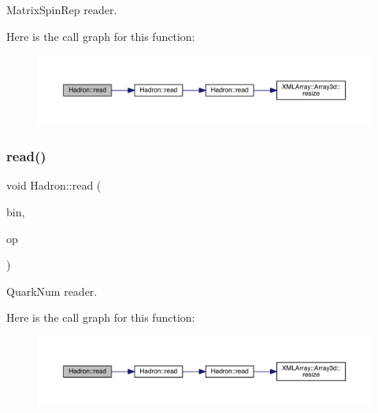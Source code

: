 Matrix\+Spin\+Rep reader. 

Here is the call graph for this function\+:
\nopagebreak
\begin{figure}[H]
\begin{center}
\leavevmode
\includegraphics[width=350pt]{d1/daf/namespaceHadron_ad46ef728c9d609cbf63217c66bdf0285_cgraph}
\end{center}
\end{figure}
\mbox{\label{namespaceHadron_a1f04a3926b07155fbf7e7887169d7f4e}} 
\subsubsection{\texorpdfstring{read()}{read()}\hspace{0.1cm}{\footnotesize\ttfamily [19/94]}}
{\footnotesize\ttfamily void Hadron\+::read (\begin{DoxyParamCaption}\item[{\mbox{\hyperlink{classADATIO_1_1BinaryReader}{Binary\+Reader}} \&}]{bin,  }\item[{\mbox{\hyperlink{structHadron_1_1QuarkNum__t}{Quark\+Num\+\_\+t}} \&}]{op }\end{DoxyParamCaption})}



Quark\+Num reader. 

Here is the call graph for this function\+:
\nopagebreak
\begin{figure}[H]
\begin{center}
\leavevmode
\includegraphics[width=350pt]{d1/daf/namespaceHadron_a1f04a3926b07155fbf7e7887169d7f4e_cgraph}
\end{center}
\end{figure}
\mbox{\label{namespaceHadron_ab1a8a0ffcdeeae3ff66ed453c1609de7}} 
